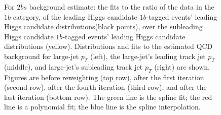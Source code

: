 \begin{figure}[htbp!]
\begin{center}
\caption{For $2bs$ background estimate: the fits to the ratio of the data in the $1b$ category, of the leading Higgs candidate $1b$-tagged events' leading Higgs candidate distributions(black points), over the subleading Higgs candidate $1b$-tagged events' leading Higgs candidate distributions (yellow). Distributions and fits to the estimated QCD background for large-\R jet $p_{T}$ (left),  the large-\R jet's leading track jet $p_T$ (middle), and large-\R jet's subleading track jet $p_T$ (right) are shown.  Figures are before reweighting (top row), after the first iteration (second row), after the fourth iteration (third row), and after the last iteration (bottom row). The green line is the spline fit; the red line is a polynomial fit; the blue line is the spline interpolation.}
\label{fig:rw-2bs-subl}
\end{center}
\end{figure}

